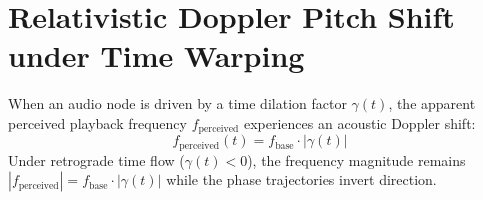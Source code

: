 \documentclass[11pt,a4paper]{article}
\begin{document}
\section{Relativistic Doppler Pitch Shift under Time Warping}
When an audio node is driven by a time dilation factor $\gamma(t)$, the apparent perceived playback frequency $f_{\text{perceived}}$ experiences an acoustic Doppler shift:
\begin{equation}
f_{\text{perceived}}(t) = f_{\text{base}} \cdot |\gamma(t)|
\end{equation}
Under retrograde time flow ($\gamma(t) < 0$), the frequency magnitude remains $|f_{\text{perceived}}| = f_{\text{base}} \cdot |\gamma(t)|$ while the phase trajectories invert direction.
\end{document}
